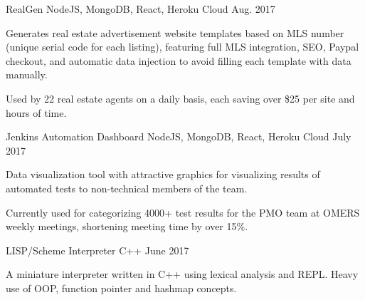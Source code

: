\begin{cventries}

  \cvproject
    {} %
    {RealGen \href{https://github.com/jsun98/RealGen}{\faGithub\acvHeaderIconSep} 
    \tiny NodeJS, MongoDB, React, Heroku Cloud} %
    {} %
    {Aug. 2017} %
    {
      \begin{cvitems} %
        \item {Generates real estate advertisement website templates based on MLS number (unique serial code for each listing), featuring full MLS integration, SEO, Paypal checkout, and automatic data injection to avoid filling each template with data manually.}
         \item {Used by 22 real estate agents on a daily basis, each saving over \$25 per site and hours of time.}
      \end{cvitems}
    }
    
  \cvproject
    {} %
    {Jenkins Automation Dashboard \href{https://github.com/jsun98/Jenkins-Automation-Dashboard}{\faGithub\acvHeaderIconSep}
    \tiny NodeJS, MongoDB, React, Heroku Cloud} %
    {} %
    {July 2017} %
    {
      \begin{cvitems} %
        \item {Data visualization tool with attractive graphics for visualizing results of automated tests to non-technical members of the team.}
        \item {Currently used for categorizing 4000+ test results for the PMO team at OMERS weekly meetings, shortening meeting time by over 15\%.}
      \end{cvitems}
    }


  \cvproject
    {} %
    {LISP/Scheme Interpreter \href{https://github.com/jsun98/SchemePlusPlus}{\faGithub\acvHeaderIconSep} \tiny C++} %
    {} %
    {June 2017} %
    {
      \begin{cvitems} %
        \item {A miniature interpreter written in C++ using lexical analysis and REPL. Heavy use of OOP, function pointer and hashmap concepts.}
      \end{cvitems}
    }






\end{cventries}
